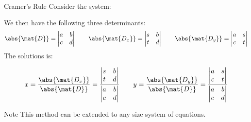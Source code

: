 \documentclass{beamer}
\begin{document}
\begin{frame}
\begin{block}{Cramer's Rule}
Consider the system:
\begin{center}
\end{center}\pause
We then have the following three determinants:
\begin{equation*}
\abs{\mat{D}}=
\begin{vmatrix}
a & b \\
c & d \\
\end{vmatrix}\qquad
\abs{\mat{D_x}}=
\begin{vmatrix}
s & b \\
t & d \\
\end{vmatrix}\qquad
\abs{\mat{D_y}}=
\begin{vmatrix}
a & s \\
c & t \\
\end{vmatrix}
\end{equation*}\pause
The solutions is:

\vspace{-3mm}
\begin{equation*}
x=\dfrac{\abs{\mat{D_x}}}{\abs{\mat{D}}}=\dfrac{%
\begin{vmatrix}
s & b \\
t & d \\
\end{vmatrix}}{%
\begin{vmatrix}
a & b \\
c & d \\
\end{vmatrix}}
\qquad
y=\dfrac{\abs{\mat{D_y}}}{\abs{\mat{D}}}=\dfrac{%
\begin{vmatrix}
a & s \\
c & t \\
\end{vmatrix}}{%
\begin{vmatrix}
a & b \\
c & d \\
\end{vmatrix}}
\end{equation*}
\end{block}\pause
\begin{block}{Note}
This method can be extended to any size system of equations.
\end{block}
\end{frame}
\end{document}
